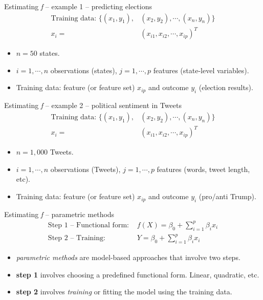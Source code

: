 \documentclass{beamer}
\begin{document}
\begin{frame}{Estimating \textit{f} -- example 1 -- predicting elections} %
	\begin{align*}
	\text{Training data: }	\{(x_{1},y_{1}), & (x_{2},y_{2}), \cdots, (x_{n},y_{n}) \} \\ 
		x_{i} = & (x_{i1}, x_{i2}, \cdots, x_{ip})^{T} 
	\end{align*}

\begin{itemize}
	\item $n = 50$ states.
	\item $i = 1,\cdots,n$ observations (states), $j = 1,\cdots,p$ features (state-level variables).
	\item Training data: feature (or feature set) $x_{ip}$ and outcome $y_{i}$ (election results).
\end{itemize}

\end{frame}


\begin{frame}{Estimating \textit{f} -- example 2 --  political sentiment  in Tweets} %
	\begin{align*}
	\text{Training data: }	\{(x_{1},y_{1}), & (x_{2},y_{2}), \cdots, (x_{n},y_{n}) \} \\ 
		x_{i} = & (x_{i1}, x_{i2}, \cdots, x_{ip})^{T}
	\end{align*}

\begin{itemize}
	\item $n = 1,000$ Tweets.
	\item $i = 1,\cdots,n$ observations (Tweets), $j = 1,\cdots,p$ features (words, tweet length, etc).
	\item Training data: feature (or feature set) $x_{ip}$ and outcome $y_{i}$ (pro/anti Trump).
\end{itemize}

\end{frame}


\begin{frame}{Estimating \textit{f} -- parametric methods} %
\begin{align*}
	\text{Step 1 -- Functional form: } & f(X) = \beta_{0} + \sum_{i=1}^{p}\beta_{i} x_{i} \\
	\text{Step 2 -- Training: } & Y = \beta_{0} + \sum_{i=1}^{p}\beta_{i} x_{i}
\end{align*}
	\begin{itemize}
		\item \textit{parametric methods} are model-based approaches that involve two steps.
		\item \textbf{step 1} involves choosing a predefined functional form. Linear, quadratic, etc. 
		\item \textbf{step 2} involves \textit{training} or fitting the model using the training data.
	\end{itemize}

\end{frame}
\end{document}
